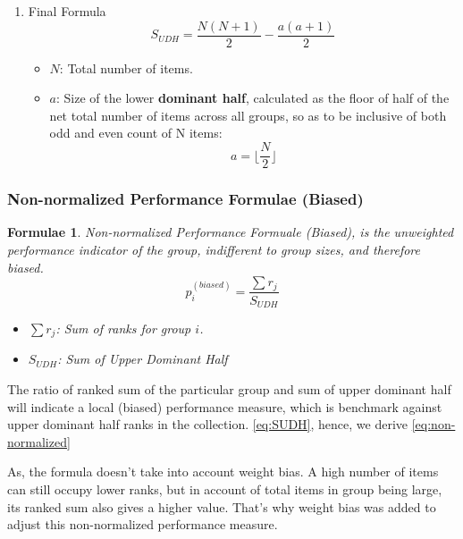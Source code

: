 \documentclass[a4paper,fleqn,review]{cas-sc}
\newtheorem{theorem}{Formulae}
\begin{document}
\begin{enumerate}
\item{Final Formula}
\begin{equation}
S_{UDH} = \frac{N(N + 1)}{2} - \frac{a(a+1)}{2}
\label{eq:SUDH}
\end{equation}

\begin{itemize}
  \item \( N \): Total number of items.
  \item \( a \): Size of the lower \textbf{dominant half}, calculated as the floor of half of the net total number of items across all groups, so as to be inclusive of both odd and even count of N items:
  \begin{equation}
  a = \lfloor \frac{N}{2} \rfloor
  \end{equation}
\end{itemize}
\end{enumerate}

\subsubsection{Non-normalized Performance Formulae (Biased)}


\begin{theorem}\label{def:non-normalized-biased-performance-measure}
	Non-normalized Performance Formuale (Biased), is the unweighted performance indicator of the group, indifferent to group sizes, and therefore biased.
\begin{equation}
    p_i^{(biased)} = \frac{\sum r_j}{ S_{UDH} }
 \label{eq:p-biased}
\end{equation}
\begin{itemize}
    \item \textbf{$\sum r_j$}: Sum of ranks for group $i$.
    \item \textbf{$S_{UDH}$}: Sum of Upper Dominant Half
\end{itemize}
\end{theorem}

\begin{pot}[\ref{def:non-normalized-biased-performance-measure}]
	The ratio of ranked sum of the particular group and sum of upper dominant half will indicate a local (biased) performance measure, which is benchmark against upper dominant half ranks in the collection. \autoref{eq:SUDH}, hence, we derive \autoref{eq:non-normalized}
\end{pot}

As, the formula doesn't take into account weight bias. A high number of items can still occupy lower ranks, but in account of total items in group being large, its ranked sum also gives a higher value. That's why weight bias was added to adjust this non-normalized performance measure.
\end{document}

